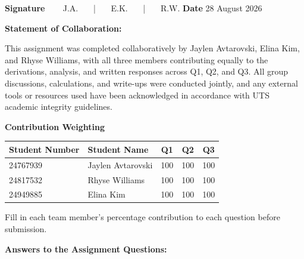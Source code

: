 \documentclass[11pt,a4paper]{article}
\begin{document}
{\begin{minipage}{\dimexpr\textwidth-2\fboxsep-2\fboxrule\relax}
\vspace{12pt}
\textbf{Signature} \,\,\,\,\,\,\,\,\, J.A. \,\,\,\,\,\,\,\,\,|\,\,\,\,\,\,\,\,\, E.K. \,\,\,\,\,\,\,\,\,|\,\,\,\,\,\,\,\,\, R.W. \hfill \textbf{Date} 28 August 2026\par

\vspace{10pt}
\textbf{Statement of Collaboration:}\par
\vspace{2pt}
This assignment was completed collaboratively by Jaylen Avtarovski, Elina Kim, 
and Rhyse Williams, with all three members contributing equally to the derivations, 
analysis, and written responses across Q1, Q2, and Q3. All group discussions, 
calculations, and write-ups were conducted jointly, and any external tools or 
resources used have been acknowledged in accordance with UTS academic 
integrity guidelines.
\vspace{6pt}
\end{minipage}}

\vfill

\newpage

\begin{center}
\textbf{Contribution Weighting}\par
\vspace{4pt}
\begin{tabular}{|l|l|c|c|c|}
\hline
\textbf{Student Number} & \textbf{Student Name} & \textbf{Q1} & \textbf{Q2} & \textbf{Q3}\\
\hline
24767939 & Jaylen Avtarovski & 100 & 100 & 100\\ \hline
24817532 & Rhyse Williams & 100 & 100 & 100\\ \hline
24949885 & Elina Kim & 100 & 100 & 100\\ \hline
\end{tabular}
\end{center}

\vspace{6pt}
{\small Fill in each team member's percentage contribution to each question
before submission.}

\vspace{10pt}

\begin{center}\large\bfseries Answers to the Assignment Questions:\end{center}

\end{document}
